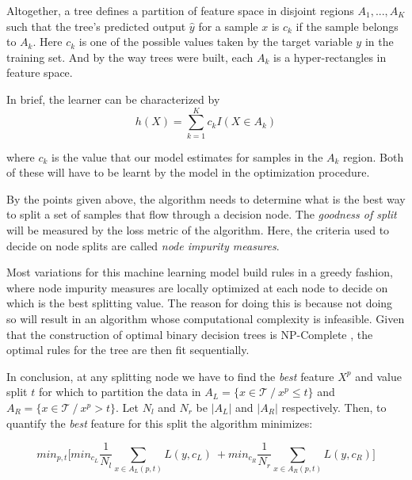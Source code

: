 Altogether, a tree defines a partition of feature space in disjoint regions $A_1,...,A_K$ such that the tree's predicted output $\hat{y}$ for a sample $x$ is $c_k$ if the sample belongs to $A_k$. Here $c_k$ is one of the possible values taken by the target variable $y$ in the training set. And by the way trees were built, each $A_k$ is a hyper-rectangles in feature space.

In brief, the learner can be characterized by
\[
h(X) = \sum_{k=1}^K c_k I(X \in A_k)
\]\label{equation-decisionTreeModel}

where $c_k$ is the value that our model estimates for samples in the $A_k$ region. Both of these will have to be learnt by the model in the optimization procedure. %

By the points given above, the algorithm needs to determine what is the best way to split a set of samples that flow through a decision node. The \textit{goodness of split} will be measured by the loss metric of the algorithm. Here, the criteria used to decide on node splits are called \textit{node impurity measures}.

Most variations for this machine learning model build rules in a greedy fashion, where node impurity measures are locally optimized at each node to decide on which is the best splitting value. The reason for doing this is because not doing so will result in an algorithm whose computational complexity is infeasible. Given that the construction of optimal binary decision trees is NP-Complete \textcite{decisionTreesNP}, the optimal rules for the tree are then fit sequentially.

In conclusion, at any splitting node we have to find the \textit{best} feature $X^p$ and value split $t$ for which to partition the data in
$A_L = \{x \in \mathcal{T} \  / \ x^p \leq t \} $ and $A_R = \{x \in \mathcal{T}\  / \ x^p> t \} $. Let $N_l$ and $N_r$ be $|A_L|$ and $|A_R|$ respectively. Then, to quantify the \textit{best} feature for this split the algorithm minimizes:


\[
min_{p,t} \big[ min_{c_L }   \frac{1}{N_l}\sum_{x \in A_L(p,t) } L(y,c_L)        \ +   min_{c_R}   \frac{1}{N_r}\sum_{x \in A_R(p,t) }  L(y,c_R) \big]
\]\label{equation-decisionTreeGreedyOptimization}


